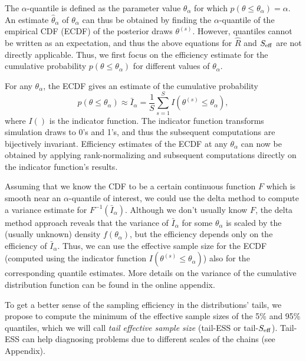 \documentclass[american,]{article}
\begin{document}
The \(\alpha\)-quantile
is defined as the parameter value \(\theta_\alpha\) for which
\(p(\theta \leq \theta_\alpha) = \alpha\). An estimate
\(\hat{\theta}_\alpha\) of \(\theta_\alpha\) can thus be obtained by
finding the \(\alpha\)-quantile of the empirical CDF (ECDF) of the
posterior draws \(\theta^{(s)}\). However, quantiles cannot be written
as an expectation, and thus the above equations for \(\widehat{R}\) and
\(S_{\rm eff}\) are not directly applicable. Thus, we first focus on the
efficiency estimate for the cumulative probability
\(p(\theta \leq \theta_\alpha)\) for different values of
\(\theta_\alpha\).

For any \(\theta_\alpha\), the ECDF gives an estimate of the cumulative
probability
\begin{equation}
p(\theta \leq \theta_\alpha) \approx \bar{I}_\alpha = \frac{1}{S}\sum_{s=1}^S
I(\theta^{(s)} \leq\theta_\alpha),
\end{equation}
where \(I()\) is the indicator function. The indicator function
transforms simulation draws to 0's and 1's, and thus the subsequent
computations are bijectively invariant. Efficiency estimates of the ECDF
at any \(\theta_\alpha\) can now be obtained by applying
rank-normalizing and subsequent computations directly on the indicator
function's results.

Assuming that we know the CDF to be a certain continuous function \(F\)
which is smooth near an \(\alpha\)-quantile of interest, we could use
the delta method to compute a variance estimate for
\(F^{-1}(\bar{I}_\alpha)\). Although we don't usually know \(F\), the
delta method approach reveals that the variance of \(\bar{I}_\alpha\)
for some \(\theta_\alpha\) is scaled by the (usually unknown) density
\(f(\theta_\alpha)\), but the efficiency depends only on the efficiency
of \(\bar{I}_\alpha\). Thus, we can use the effective sample size for
the ECDF (computed using the indicator function
\(I(\theta^{(s)} \leq \theta_\alpha)\)) also for the corresponding
quantile estimates. More details on the variance of the cumulative
distribution function can be found in the online appendix.

To get a better sense of the sampling efficiency in the
distributions' tails, we propose to compute the minimum of the effective
sample sizes of the 5\% and 95\% quantiles, which we will call
\emph{tail effective sample size} (tail-ESS or tail-\(S_{\rm eff}\)).
Tail-ESS can help diagnosing problems due to different scales of the
chains (see Appendix).

\end{document}
